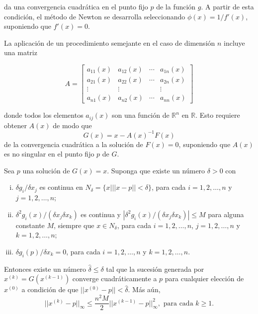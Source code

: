 da una convergencia cuadrática en el punto fijo $p$ de la función $g$. A partir de esta condición, el método de Newton se desarrolla 
seleccionando $\phi(x) = 1/f'(x)$, suponiendo que $f'(x)=0$.

La aplicación de un procedimiento semejante en el caso de dimensión $n$ incluye una matriz

\begin{equation}
	A = \begin{bmatrix}
		a_{11}(x) & a_{12}(x) & \cdots & a_{1n}(x) \\ 
		a_{21}(x) & a_{22}(x) & \cdots & a_{2n}(x) \\ 
		\vdots & \vdots &  & \vdots \\ 
		a_{n1}(x) & a_{n2}(x) & \cdots & a_{nn}(x)
	\end{bmatrix}
	\label{eq:SENLNewton1}
\end{equation}

donde todos los elementos $a_{ij}(x)$ son una función de $\mathbb{R}^n$ en $\mathbb{R}$. Esto requiere obtener $A(x)$ de modo que 
\begin{equation*}
	G(x) = x-A(x)^{-1}F(x)
\end{equation*}
de la convergencia cuadrática a la solución de $F(x) = 0$, suponiendo que $A(x)$ es no singular en el punto fijo $p$ de $G$.
\begin{theorem}[]
	Sea $p$ una solución de $G(x)=x$. Suponga que existe un número $\delta >0$ con
	\begin{enumerate}[(i)]
		\item $\delta g_i/\delta x_j$ es continua en $N_\delta = \{x| ||x-p||<\delta \}$, para cada $i=1,2,\dots,n$ y $j=1,2,\dots,n$;
		\item $\delta^2g_i(x)/(\delta x_j\delta x_k)$ es continua y $|\delta^2g_i(x)/(\delta x_j\delta x_k)|\leq M$ para alguna constante $M$, 
			siempre que $x\in N_{\delta}$, para cada $i=1,2,\dots, n$, $j=1,2,\dots,n$ y $k=1,2,\dots,n$; 
		\item $\delta g_i(p)/\delta x_k = 0$, para cada $i=1,2,\dots,n$ y $k=1,2,\dots,n$.
	\end{enumerate}		
	Entonces existe un número $\hat{\delta}\leq \delta$ tal que la sucesión generada por $x^{(k)} = G(x^{(k-1)})$ converge cuadráticamente a $p$ 
	para cualquier elección de $x^{(0)}$ a condición de que $||x^{(0)} - p|| < \hat{\delta}$. Más aún,
	\begin{equation*}
		||x^{(k)} - p||_\infty \leq \frac{n^2M}{2}||x^{(k-1)}-p||_\infty^2, \text{ para cada } k\geq 1.
	\end{equation*}	 
	\label{teo:SENLNewton}	
\end{theorem}

